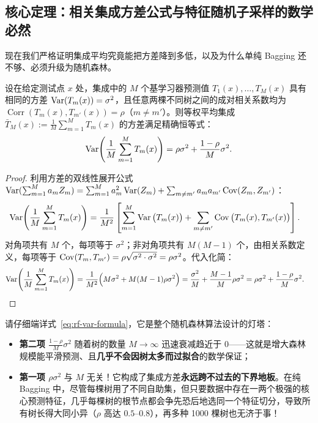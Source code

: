 \subsection{核心定理：相关集成方差公式与特征随机子采样的数学必然}

现在我们严格证明集成平均究竟能把方差降到多低，以及为什么单纯 Bagging 还不够、必须升级为随机森林。

\begin{thmBox}
\begin{theorem}[相关同分布集成的精确方差公式]\label{thm:rf-variance}
设在给定测试点 $x$ 处，集成中的 $M$ 个基学习器预测值 $T_1(x), \dots, T_M(x)$ 具有相同的方差 $\operatorname{Var}(T_m(x)) = \sigma^2$，且任意两棵不同树之间的成对相关系数均为 $\operatorname{Corr}(T_m(x), T_{m'}(x)) = \rho$（$m \neq m'$）。则等权平均集成 $\bar{T}_M(x) := \frac{1}{M}\sum_{m=1}^{M} T_m(x)$ 的方差满足精确恒等式：
\begin{equation}\label{eq:rf-var-formula}
  \operatorname{Var}\!\left(\frac{1}{M}\sum_{m=1}^{M} T_m(x)\right) = \rho\sigma^2 + \frac{1 - \rho}{M}\sigma^2.
\end{equation}
\end{theorem}
\end{thmBox}

\begin{proof}
利用方差的双线性展开公式 $\operatorname{Var}(\sum_{m=1}^M a_m Z_m) = \sum_{m=1}^M a_m^2 \operatorname{Var}(Z_m) + \sum_{m \neq m'} a_m a_{m'} \operatorname{Cov}(Z_m, Z_{m'})$：
\begin{align*}
  \operatorname{Var}\!\left(\frac{1}{M}\sum_{m=1}^{M} T_m(x)\right)
  &= \frac{1}{M^2}\left[\sum_{m=1}^{M}\operatorname{Var}\big(T_m(x)\big) + \sum_{m \neq m'}\operatorname{Cov}\big(T_m(x), T_{m'}(x)\big)\right].
\end{align*}
对角项共有 $M$ 个，每项等于 $\sigma^2$；非对角项共有 $M(M - 1)$ 个，由相关系数定义，每项等于 $\operatorname{Cov}(T_m, T_{m'}) = \rho\sqrt{\sigma^2 \cdot \sigma^2} = \rho\sigma^2$。代入化简：
\begin{align*}
  \operatorname{Var}\!\left(\frac{1}{M}\sum_{m=1}^{M} T_m(x)\right)
  &= \frac{1}{M^2}\Big(M\sigma^2 + M(M - 1)\rho\sigma^2\Big)
   = \frac{\sigma^2}{M} + \frac{M - 1}{M}\rho\sigma^2
   = \rho\sigma^2 + \frac{1 - \rho}{M}\sigma^2. \qedhere
\end{align*}
\end{proof}

请仔细端详式~\eqref{eq:rf-var-formula}，它是整个随机森林算法设计的灯塔：
\begin{itemize}
  \item \textbf{第二项 $\frac{1-\rho}{M}\sigma^2$} 随着树的数量 $M \to \infty$ 迅速衰减趋近于 $0$——这就是增大森林规模能平滑预测、且\textbf{几乎不会因树太多而过拟合}的数学保证；
  \item \textbf{第一项 $\rho\sigma^2$} 与 $M$ 无关！它构成了集成方差\textbf{永远跨不过去的下界地板}。在纯 Bagging 中，尽管每棵树用了不同自助集，但只要数据中存在一两个极强的核心预测特征，几乎每棵树的根节点都会争先恐后地选同一个特征切分，导致所有树长得大同小异（$\rho$ 高达 $0.5\text{--}0.8$），再多种 1000 棵树也无济于事！
\end{itemize}

